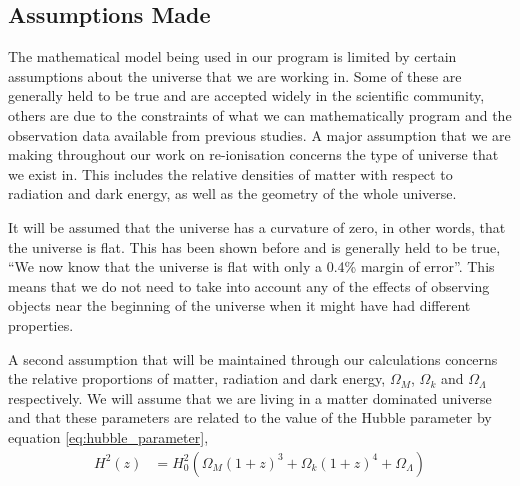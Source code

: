 
\subsection{Assumptions Made}
	\label{sub:assumptions_made}
	The mathematical model being used in our program is limited by certain assumptions about the universe that we are working in. Some of these are generally held to be true and are accepted widely in the scientific community, others are due to the constraints of what we can mathematically program and the observation data available from previous studies. A major assumption that we are making throughout our work on re-ionisation concerns the type of universe that we exist in. This includes the relative densities of matter with respect to radiation and dark energy, as well as the geometry of the whole universe. 

	It will be assumed that the universe has a curvature of zero, in other words, that the universe is flat. This has been shown before and is generally held to be true, ``We now know that the universe is flat with only a 0.4\% margin of error''\cite{nasa_uni_shape}. This means that we do not need to take into account any of the effects of observing objects near the beginning of the universe when it might have had different properties.

	A second assumption that will be maintained through our calculations concerns the relative proportions of matter, radiation and dark energy, $\Omega_M$, $\Omega_k$ and $\Omega_{\Lambda}$ respectively. We will assume that we are living in a matter dominated universe and that these parameters are related to the value of the Hubble parameter by equation \ref{eq:hubble_parameter},
	\begin{align}
		H^2(z) &= H_0^2\left( \Omega_M(1+z)^3 + \Omega_k(1+z)^4 + \Omega_{\Lambda} \right)
		\label{eq:hubble_parameter}
	\end{align}
	
